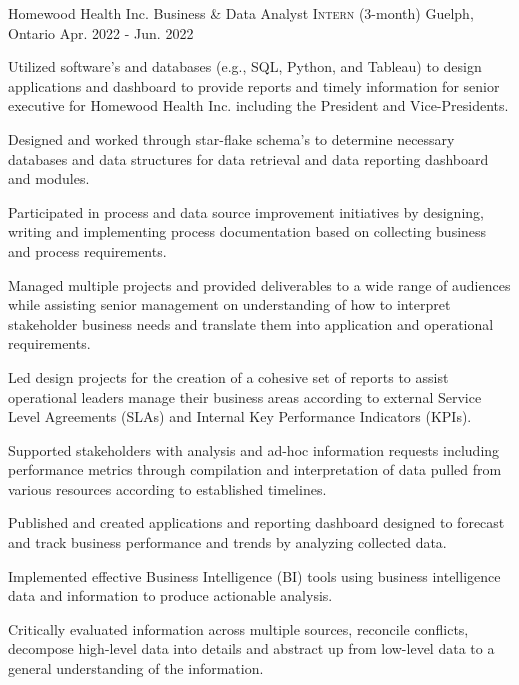 \begin{cventries}
  \cventry
    {Homewood Health Inc.} %
    {Business \& Data Analyst \textsc{Intern} (3-month)} %
    {Guelph, Ontario } %
    {Apr. 2022 - Jun. 2022} %
    {
      \begin{cvitems} %
        \item Utilized software's and databases (e.g., SQL, Python, and Tableau) to design applications and dashboard to provide reports and timely information for senior executive for Homewood Health Inc. including the President and Vice-Presidents.
        \item Designed and worked through star-flake schema's to determine necessary databases and data structures for data retrieval and data reporting dashboard and modules.
        \item Participated in process and data source improvement initiatives by designing, writing and implementing process documentation based on collecting business and process requirements.
        \item Managed multiple projects and provided deliverables to a wide range of audiences while assisting senior management on understanding of how to interpret stakeholder business needs and translate them into application and operational requirements.
        \item Led design projects for the creation of a cohesive set of reports to assist operational leaders manage their business areas according to external Service Level Agreements (SLAs) and Internal Key Performance Indicators (KPIs).
        \item Supported stakeholders with analysis and ad-hoc information requests including performance metrics through compilation and interpretation of data pulled from various resources according to established timelines.
        \item Published and created applications and reporting dashboard designed to forecast and track business performance and trends by analyzing collected data.
        \item Implemented effective Business Intelligence (BI) tools using business intelligence data and information to produce actionable analysis.
        \item Critically evaluated information across multiple sources, reconcile conflicts, decompose high-level data into details and abstract up from low-level data to a general understanding of the information.
      \end{cvitems}
    }



\end{cventries}
